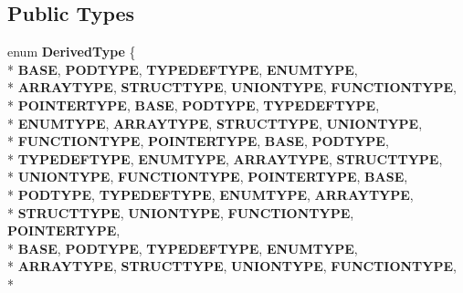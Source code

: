 \subsection*{Public Types}
\begin{DoxyCompactItemize}
\item 
enum {\bfseries Derived\-Type} \{ \\*
{\bfseries B\-A\-S\-E}, 
{\bfseries P\-O\-D\-T\-Y\-P\-E}, 
{\bfseries T\-Y\-P\-E\-D\-E\-F\-T\-Y\-P\-E}, 
{\bfseries E\-N\-U\-M\-T\-Y\-P\-E}, 
\\*
{\bfseries A\-R\-R\-A\-Y\-T\-Y\-P\-E}, 
{\bfseries S\-T\-R\-U\-C\-T\-T\-Y\-P\-E}, 
{\bfseries U\-N\-I\-O\-N\-T\-Y\-P\-E}, 
{\bfseries F\-U\-N\-C\-T\-I\-O\-N\-T\-Y\-P\-E}, 
\\*
{\bfseries P\-O\-I\-N\-T\-E\-R\-T\-Y\-P\-E}, 
{\bfseries B\-A\-S\-E}, 
{\bfseries P\-O\-D\-T\-Y\-P\-E}, 
{\bfseries T\-Y\-P\-E\-D\-E\-F\-T\-Y\-P\-E}, 
\\*
{\bfseries E\-N\-U\-M\-T\-Y\-P\-E}, 
{\bfseries A\-R\-R\-A\-Y\-T\-Y\-P\-E}, 
{\bfseries S\-T\-R\-U\-C\-T\-T\-Y\-P\-E}, 
{\bfseries U\-N\-I\-O\-N\-T\-Y\-P\-E}, 
\\*
{\bfseries F\-U\-N\-C\-T\-I\-O\-N\-T\-Y\-P\-E}, 
{\bfseries P\-O\-I\-N\-T\-E\-R\-T\-Y\-P\-E}, 
{\bfseries B\-A\-S\-E}, 
{\bfseries P\-O\-D\-T\-Y\-P\-E}, 
\\*
{\bfseries T\-Y\-P\-E\-D\-E\-F\-T\-Y\-P\-E}, 
{\bfseries E\-N\-U\-M\-T\-Y\-P\-E}, 
{\bfseries A\-R\-R\-A\-Y\-T\-Y\-P\-E}, 
{\bfseries S\-T\-R\-U\-C\-T\-T\-Y\-P\-E}, 
\\*
{\bfseries U\-N\-I\-O\-N\-T\-Y\-P\-E}, 
{\bfseries F\-U\-N\-C\-T\-I\-O\-N\-T\-Y\-P\-E}, 
{\bfseries P\-O\-I\-N\-T\-E\-R\-T\-Y\-P\-E}, 
{\bfseries B\-A\-S\-E}, 
\\*
{\bfseries P\-O\-D\-T\-Y\-P\-E}, 
{\bfseries T\-Y\-P\-E\-D\-E\-F\-T\-Y\-P\-E}, 
{\bfseries E\-N\-U\-M\-T\-Y\-P\-E}, 
{\bfseries A\-R\-R\-A\-Y\-T\-Y\-P\-E}, 
\\*
{\bfseries S\-T\-R\-U\-C\-T\-T\-Y\-P\-E}, 
{\bfseries U\-N\-I\-O\-N\-T\-Y\-P\-E}, 
{\bfseries F\-U\-N\-C\-T\-I\-O\-N\-T\-Y\-P\-E}, 
{\bfseries P\-O\-I\-N\-T\-E\-R\-T\-Y\-P\-E}, 
\\*
{\bfseries B\-A\-S\-E}, 
{\bfseries P\-O\-D\-T\-Y\-P\-E}, 
{\bfseries T\-Y\-P\-E\-D\-E\-F\-T\-Y\-P\-E}, 
{\bfseries E\-N\-U\-M\-T\-Y\-P\-E}, 
\\*
{\bfseries A\-R\-R\-A\-Y\-T\-Y\-P\-E}, 
{\bfseries S\-T\-R\-U\-C\-T\-T\-Y\-P\-E}, 
{\bfseries U\-N\-I\-O\-N\-T\-Y\-P\-E}, 
{\bfseries F\-U\-N\-C\-T\-I\-O\-N\-T\-Y\-P\-E}, 
\\*

\end{DoxyCompactItemize}
